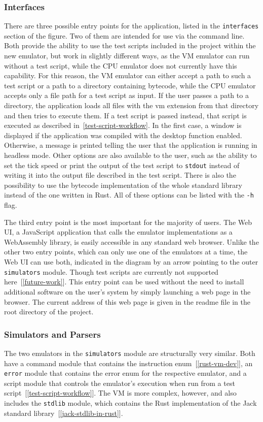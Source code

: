 \subsubsection{Interfaces} \label{interfaces}
There are three possible entry points for the application, listed in the \verb+interfaces+ section of the figure.
Two of them are intended for use via the command line.
Both provide the ability to use the test scripts included in the project within the new emulator, but work in slightly different ways, as the VM emulator can run without a test script, while the CPU emulator does not currently have this capability.
For this reason, the VM emulator can either accept a path to such a test script or a path to a directory containing bytecode, while the CPU emulator accepts only a file path for a test script as input.
If the user passes a path to a directory, the application loads all files with the vm extension from that directory and then tries to execute them.
If a test script is passed instead, that script is executed as described in~\cref{test-script-workflow}.
In the first case, a window is displayed if the application was compiled with the desktop function enabled.
Otherwise, a message is printed telling the user that the application is running in headless mode.
Other options are also available to the user, such as the ability to set the tick speed or print the output of the test script to \verb+stdout+ instead of writing it into the output file described in the test script.
There is also the possibility to use the bytecode implementation of the whole standard library instead of the one written in Rust.
All of these options can be listed with the \verb+-h+ flag.

The third entry point is the most important for the majority of users.
The Web UI, a JavaScript application that calls the emulator implementations as a WebAssembly library, is easily accessible in any standard web browser.
Unlike the other two entry points, which can only use one of the emulators at a time, the Web UI can use both, indicated in the diagram by an arrow pointing to the outer \verb+simulators+ module.
Though test scripts are currently not supported here~[\ref{future-work}].
This entry point can be used without the need to install additional software on the user's system by simply launching a web page in the browser.
The current address of this web page is given in the readme file in the root directory of the project.

\subsubsection{Simulators and Parsers}
The two emulators in the \verb+simulators+ module are structurally very similar.
Both have a command module that contains the instruction enum~[\ref{rust-vm-dev}], an \verb+error+ module that contains the error enum for the respective emulator, and a script module that controls the emulator's execution when run from a test script~[\ref{test-script-workflow}].
The VM is more complex, however, and also includes the \verb+stdlib+ module, which contains the Rust implementation of the Jack standard library~[\ref{jack-stdlib-in-rust}].

